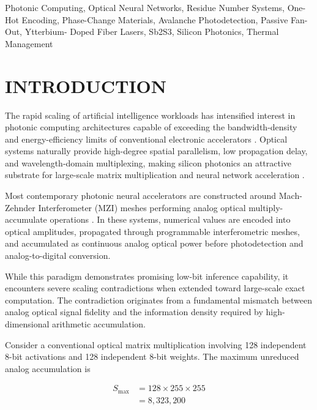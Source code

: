 \documentclass[journal]{IEEEtran}
\begin{document}
\begin{IEEEkeywords}
Photonic Computing, Optical Neural Networks, Residue Number Systems, One-Hot Encoding, Phase-Change Materials, Avalanche Photodetection, Passive Fan-Out, Ytterbium- Doped Fiber Lasers, Sb2S3, Silicon Photonics, Thermal Management
\end{IEEEkeywords}

\section{INTRODUCTION}

The rapid scaling of artificial intelligence workloads has intensified interest in photonic computing architectures capable of exceeding the bandwidth-density and energy-efficiency limits of conventional electronic accelerators \cite{Miller2017}\cite{Miller2013}. Optical systems naturally provide high-degree spatial parallelism, low propagation delay, and wavelength-domain multiplexing, making silicon photonics an attractive substrate for large-scale matrix multiplication and neural network acceleration \cite{Shen2017}\cite{Tait2017}\cite{Ashtiani2022}\cite{Feldmann2019}. 

Most contemporary photonic neural accelerators are constructed around Mach-Zehnder Interferometer (MZI) meshes performing analog optical multiply-accumulate operations \cite{Shen2017}\cite{Harris2018}\cite{Feldmann2021}\cite{Reed2010}\cite{Sinatkas2021}. In these systems, numerical values are encoded into optical amplitudes, propagated through programmable interferometric meshes, and accumulated as continuous analog optical power before photodetection and analog-to-digital conversion.

While this paradigm demonstrates promising low-bit inference capability, it encounters severe scaling contradictions when extended toward large-scale exact computation. The contradiction originates from a fundamental mismatch between analog optical signal fidelity and the information density required by high-dimensional arithmetic accumulation.

Consider a conventional optical matrix multiplication involving 128 independent 8-bit activations and 128 independent 8-bit weights. The maximum unreduced analog accumulation is

\begin{align}
S_{\max} &= 128 \times 255 \times 255 \\
&= 8{,}323{,}200 \label{eq:max_accumulation}
\end{align}
\end{document}
